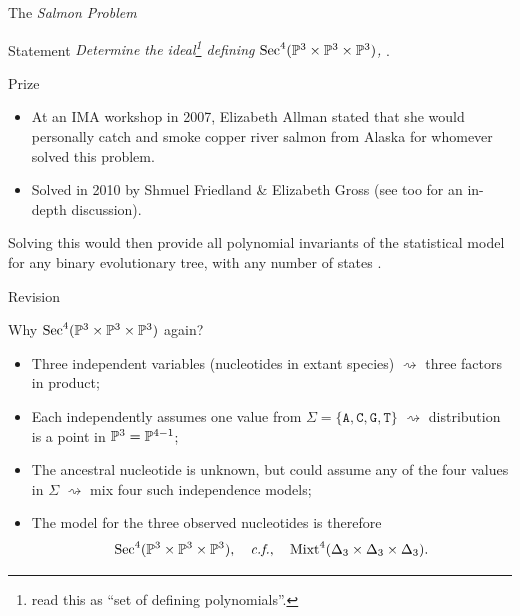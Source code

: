 \begin{frame}{The \emph{Salmon Problem}}

\begin{block}{Statement}
    \emph{Determine the ideal\footnote{read this as ``set of defining polynomials''.} defining $\operatorname{Sec}^{4}(\mathbb{P}^{3} \times \mathbb{P}^{3} \times \mathbb{P}^{3})$,} \cite{EAsalmon}.
\end{block}

\begin{block}{Prize}
    \begin{itemize}
    \item At an IMA workshop in 2007, Elizabeth Allman stated that she would personally catch and smoke copper river salmon from Alaska for whomever solved this problem.
    \item Solved in 2010 by Shmuel Friedland \& Elizabeth Gross \cite{SFEG2012} (see \cite{DBLO2011} too for an in-depth discussion).
    \end{itemize}
\end{block}

Solving this would then provide all polynomial invariants of the statistical model for any binary evolutionary tree, with any number of states \cite{EAJR2008, DBLO2011}.

\end{frame}

\begin{frame}{Revision}

Why $\operatorname{Sec}^{4}(\mathbb{P}^{3} \times \mathbb{P}^{3} \times \mathbb{P}^{3})$ again?

\begin{itemize}
    \item Three independent variables (nucleotides in extant species) $\rightsquigarrow$ three factors in product;
    \item Each independently assumes one value from $\Sigma = \{ \texttt{A}, \texttt{C}, \texttt{G}, \texttt{T} \}$ $\rightsquigarrow$ distribution is a point in $\mathbb{P}^{3} = \mathbb{P}^{4-1}$;
    \item The ancestral nucleotide is unknown, but could assume any of the four values in $\Sigma$ $\rightsquigarrow$ mix four such independence models;
    \item The model for the three observed nucleotides is therefore
    \begin{equation*}
            \operatorname{Sec}^{4}(\mathbb{P}^{3} \times \mathbb{P}^{3} \times \mathbb{P}^{3}),\quad \text{\emph{c.f.},} \quad \operatorname{Mixt}^{4}(\Delta_{3} \times \Delta_{3} \times \Delta_{3}).
    \end{equation*}
\end{itemize}
\end{frame}